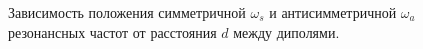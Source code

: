 \begin{figure}[h]
\caption{Зависимость положения симметричной $ \omega_s $ и антисимметричной $ \omega_a $ резонансных частот от расстояния $ d $ между диполями.}
\label{img:2D_res}
\end{figure}